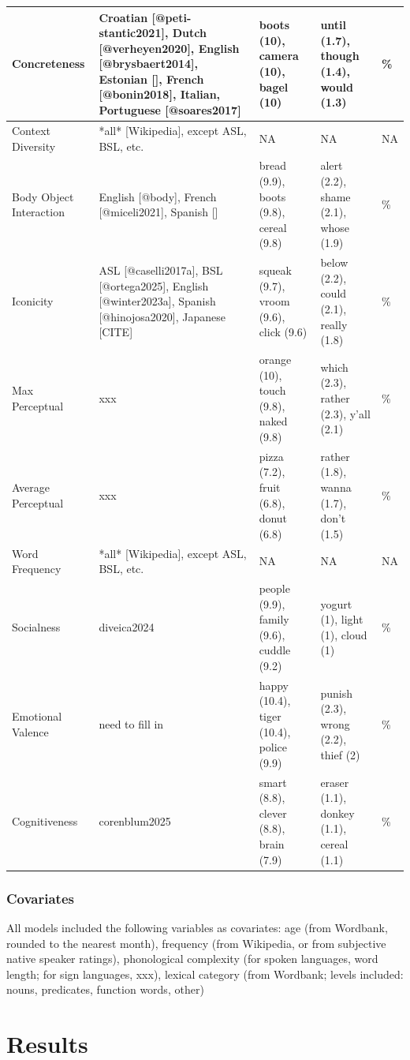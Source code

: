 \documentclass[
  man,floatsintext]{apa6}
\begin{document}
\begin{longtable}[t]{>{\raggedright\arraybackslash}p{1.9cm}|>{\raggedright\arraybackslash}p{7cm}|>{\raggedright\arraybackslash}p{2.25cm}|>{\raggedright\arraybackslash}p{2.25cm}|>{\raggedright\arraybackslash}p{2cm}}
\hline
Concreteness & Croatian [@peti-stantic2021], Dutch [@verheyen2020], English [@brysbaert2014], Estonian [], French [@bonin2018], Italian, Portuguese [@soares2017] & boots (10), camera (10), bagel (10) & until (1.7), though (1.4), would (1.3) & 96\%\\
\hline
Context Diversity & *all* [Wikipedia], except ASL, BSL, etc. & NA & NA & NA\\
\hline
Body Object Interaction & English [@body], French [@miceli2021], Spanish [] & bread (9.9), boots (9.8), cereal (9.8) & alert (2.2), shame (2.1), whose (1.9) & 77\%\\
\hline
Iconicity & ASL [@caselli2017a], BSL [@ortega2025], English [@winter2023a], Spanish [@hinojosa2020], Japanese [CITE] & squeak (9.7), vroom (9.6), click (9.6) & below (2.2), could (2.1), really (1.8) & 84\%\\
\hline
Max Perceptual & xxx & orange (10), touch (9.8), naked (9.8) & which (2.3), rather (2.3), y'all (2.1) & 97\%\\
\hline
Average Perceptual & xxx & pizza (7.2), fruit (6.8), donut (6.8) & rather (1.8), wanna (1.7), don't (1.5) & 96\%\\
\hline
Word Frequency & *all* [Wikipedia], except ASL, BSL, etc. & NA & NA & NA\\
\hline
Socialness & diveica2024 & people (9.9), family (9.6), cuddle (9.2) & yogurt (1), light (1), cloud (1) & 52\%\\
\hline
Emotional Valence & need to fill in & happy (10.4), tiger (10.4), police (9.9) & punish (2.3), wrong (2.2), thief (2) & 41\%\\
\hline
Cognitiveness & corenblum2025 & smart (8.8), clever (8.8), brain (7.9) & eraser (1.1), donkey (1.1), cereal (1.1) & 38\%\\
\hline
\end{longtable}
\endgroup{}

\subsubsection{Covariates}\label{covariates}

All models included the following variables as covariates: age (from Wordbank, rounded to the nearest month), frequency (from Wikipedia, or from subjective native speaker ratings), phonological complexity (for spoken languages, word length; for sign languages, xxx), lexical category (from Wordbank; levels included: nouns, predicates, function words, other)

\section{Results}\label{results}
\end{document}
